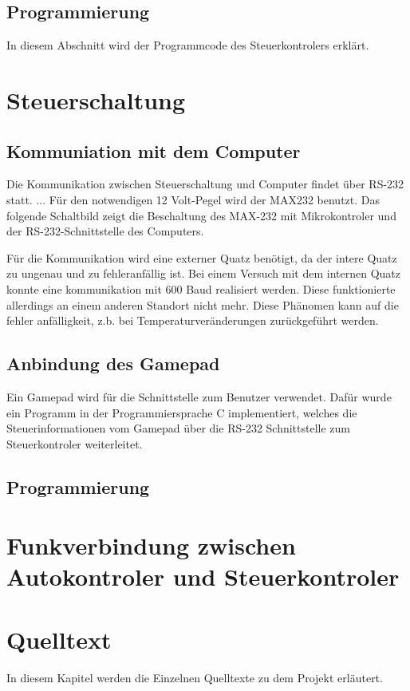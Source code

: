 \documentclass{scrartcl}
\begin{document}
	
	\subsection{Programmierung} %
		In diesem Abschnitt wird der Programmcode des Steuerkontrolers erklärt.

\section{Steuerschaltung}

	\subsection{Kommuniation mit dem Computer} %
		Die Kommunikation zwischen Steuerschaltung und Computer findet über RS-232 statt.
		...
		Für den notwendigen 12 Volt-Pegel wird der MAX232 benutzt.
		Das folgende Schaltbild zeigt die Beschaltung des MAX-232 mit Mikrokontroler und der RS-232-Schnittstelle des Computers.

		Für die Kommunikation wird eine externer Quatz benötigt, da der intere Quatz zu ungenau und zu fehleranfällig ist.
		Bei einem Versuch mit dem internen Quatz konnte eine kommunikation mit 600 Baud realisiert werden.
		Diese funktionierte allerdings an einem anderen Standort nicht mehr. Diese Phänomen kann auf die fehler anfälligkeit,
		z.b. bei Temperaturveränderungen zurückgeführt werden.

	\subsection{Anbindung des Gamepad} %
		Ein Gamepad wird für die Schnittstelle zum Benutzer verwendet.
		Dafür wurde ein Programm in der Programmiersprache C implementiert,
		welches die Steuerinformationen vom Gamepad über die RS-232 Schnittstelle zum Steuerkontroler weiterleitet.
	
	\subsection{Programmierung} %

\section{Funkverbindung zwischen Autokontroler und Steuerkontroler} %

\section{Quelltext} %
	In diesem Kapitel werden die Einzelnen Quelltexte zu dem Projekt erläutert.
\end{document}
